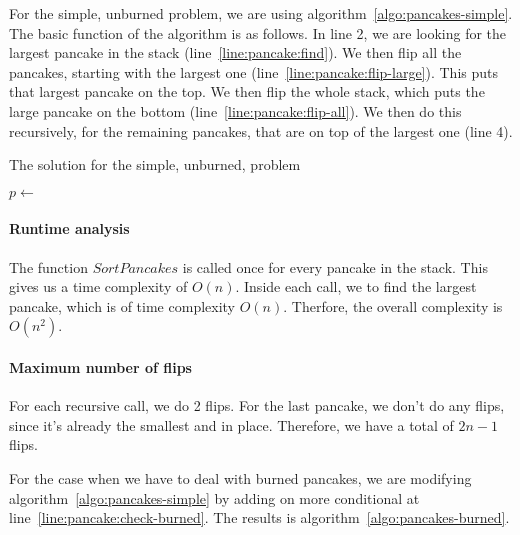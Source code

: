 

For the simple, unburned problem, we are using algorithm~\ref{algo:pancakes-simple}.
The basic function of the algorithm is as follows.
In line 2, we are looking for the largest pancake in the stack (line~\ref{line:pancake:find}).
We then flip all the pancakes, starting with the largest one (line~\ref{line:pancake:flip-large}).
This puts that largest pancake on the top.
We then flip the whole stack, which puts the large pancake on the bottom (line~\ref{line:pancake:flip-all}).
We then do this recursively, for the remaining pancakes, that are on top of the largest one (line 4).

\begin{algorithm}
	\caption{The solution for the simple, unburned, problem}
	\begin{algorithmic}[1]
			\State \Return
		\EndIf
	  	\State $p \gets$   \label{line:pancake:find}
		\State {}  \label{line:pancake:flip-large}
		\State {}  \label{line:pancake:flip-all}
		\State {}
	  \EndFunction
	\end{algorithmic}
	\label{algo:pancakes-simple}
\end{algorithm}

\paragraph{Runtime analysis}
The function $SortPancakes$ is called once for every pancake in the stack.
This gives us a time complexity of $O(n)$.
Inside each call, we to find the largest pancake, which is of time complexity $O(n)$.
Therfore, the overall complexity is $O(n^{2})$.

\paragraph{Maximum number of flips}
For each recursive call, we do 2 flips.
For the last pancake, we don't do any flips, since it's already the smallest and in place.
Therefore, we have a total of $2n-1$ flips.

For the case when we have to deal with burned pancakes, we are modifying algorithm~\ref{algo:pancakes-simple} by adding on more conditional at line~\ref{line:pancake:check-burned}.
The results is algorithm~\ref{algo:pancakes-burned}.

